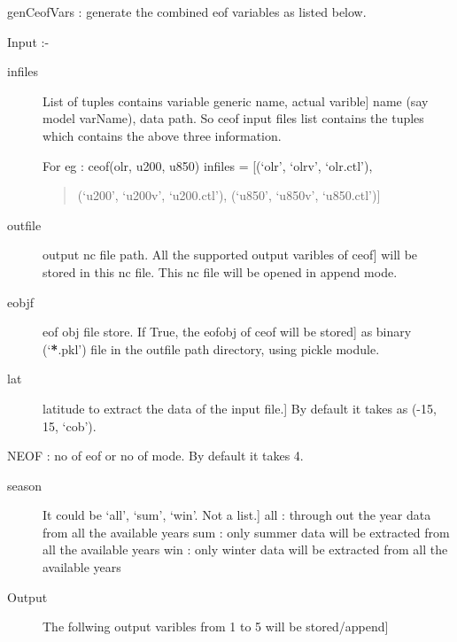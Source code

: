 \documentclass[letterpaper,10pt,english]{sphinxmanual}
\begin{document}
\begin{fulllineitems}
\label{mjo:ceof_diag.genCeofVars}
genCeofVars : generate the combined eof variables as listed below.

Input :-
\begin{description}
\item[{infiles}] \leavevmode{[}List of tuples contains variable generic name, actual varible{]}
name (say model varName), data path. So ceof input files list
contains the tuples which contains the above three information.

For eg : ceof(olr, u200, u850)
infiles = {[}(`olr', `olrv', `olr.ctl'),
\begin{quote}

(`u200', `u200v', `u200.ctl'),
(`u850', `u850v', `u850.ctl'){]}
\end{quote}

\item[{outfile}] \leavevmode{[}output nc file path. All the supported output varibles of ceof{]}
will be stored in this nc file. This nc file will be opened in
append mode.

\item[{eobjf}] \leavevmode{[}eof obj file store. If True, the eofobj of ceof will be stored{]}
as binary (`{\color{red}\bfseries{}*}.pkl') file in the outfile path directory,
using pickle module.

\item[{lat}] \leavevmode{[}latitude to extract the data of the input file.{]}
By default it takes as (-15, 15, `cob').

\end{description}

NEOF : no of eof or no of mode. By default it takes 4.
\begin{description}
\item[{season}] \leavevmode{[}It could be `all', `sum', `win'. Not a list.{]}
all : through out the year data from all the available years
sum : only summer data will be extracted from all the available years
win : only winter data will be extracted from all the available years

\item[{Output}] \leavevmode{[}The follwing output varibles from 1 to 5 will be stored/append{]}\begin{quote}


\end{quote}
\end{description}
\end{fulllineitems}
\end{document}
